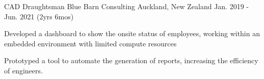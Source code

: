 \begin{cventries}
  \cventry
    {CAD Draughtsman} %
    {Blue Barn Consulting} %
    {Auckland, New Zealand} %
    {Jan. 2019 - Jun. 2021 (2yrs 6mos)} %
    {
      \begin{cvitems} %
        \item {Developed a dashboard to show the onsite status of employees, working within an embedded environment with limited compute resources}
        \item {Prototyped a tool to automate the generation of reports, increasing the efficiency of engineers.}
      \end{cvitems}
    }


\end{cventries}

